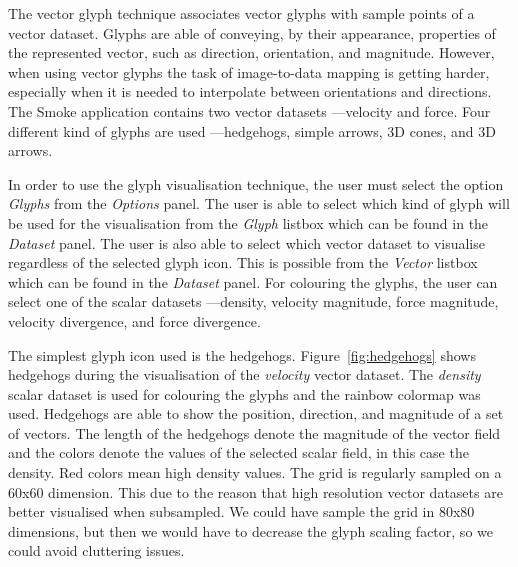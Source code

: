 The vector glyph technique associates vector glyphs with sample points of a vector dataset. Glyphs are able of conveying, by their appearance, properties of the represented vector, such as direction, orientation, and magnitude. However, when using vector glyphs the task of image-to-data mapping is getting harder, especially when it is needed to interpolate between orientations and directions. The Smoke application contains two vector datasets ---velocity and force. Four different kind of glyphs are used ---hedgehogs, simple arrows, 3D cones, and 3D arrows.

In order to use the glyph visualisation technique, the user must select the option \emph{Glyphs} from the \emph{Options} panel. The user is able to select which kind of glyph will be used for the visualisation from the \emph{Glyph} listbox which can be found in the \emph{Dataset} panel. The user is also able to select which vector dataset to visualise regardless of the selected glyph icon. This is possible from the \emph{Vector} listbox which can be found in the \emph{Dataset} panel. For colouring the glyphs, the user can select one of the scalar datasets ---density, velocity magnitude, force magnitude, velocity divergence, and force divergence.

The simplest glyph icon used is the hedgehogs. Figure~\ref{fig:hedgehogs} shows hedgehogs during the visualisation of the \emph{velocity} vector dataset. The \emph{density} scalar dataset is used for colouring the glyphs and the rainbow colormap was used. Hedgehogs are able to show the position, direction, and magnitude of a set of vectors. The length of the hedgehogs denote the magnitude of the vector field and the colors denote the values of the selected scalar field, in this case the density. Red colors mean high density values. The grid is regularly sampled on a 60x60 dimension. This due to the reason that high resolution vector datasets are better visualised when subsampled. We could have sample the grid in 80x80 dimensions, but then we would have to decrease the glyph scaling factor, so we could avoid cluttering issues.

